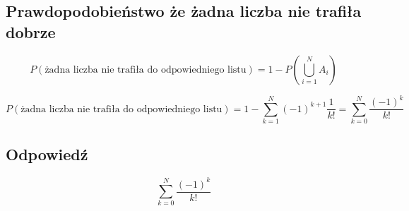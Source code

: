 \subsection*{Prawdopodobieństwo że żadna liczba nie trafiła dobrze}

\[
	P\left( \text{żadna liczba nie trafiła do odpowiedniego listu} \right) = 1 - P\left( \bigcup_{i=1}^N A_i \right)
\]

\[
	P\left( \text{żadna liczba nie trafiła do odpowiedniego listu} \right) = 1 - \sum_{k=1}^N (-1)^{k+1} \frac{1}{k!} = \sum_{k=0}^N \frac{(-1)^k}{k!}
\]

\subsection*{Odpowiedź}
\[
	\boxed{ \sum_{k=0}^N \frac{(-1)^k}{k!} }
\]
